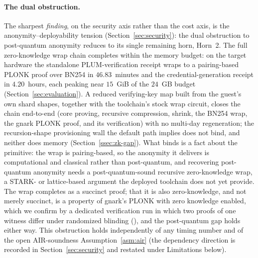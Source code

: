 \paragraph{The dual obstruction.}
The sharpest \emph{finding}, on the security axis rather than the cost axis, is the anonymity--deployability tension (Section~\ref{sec:security}): the dual obstruction to post-quantum anonymity reduces to its single remaining horn, Horn~2. The full zero-knowledge wrap chain completes within the memory budget: on the target hardware the standalone PLUM-verification receipt wraps to a pairing-based {PLONK} proof over {BN254} in $46.83$~minutes and the credential-generation receipt in $4.20$~hours, each peaking near $15$~GiB of the $24$~GB budget (Section~\ref{sec:evaluation}). A reduced verifying-key map built from the guest's own shard shapes, together with the toolchain's stock wrap circuit, closes the chain end-to-end (core proving, recursive compression, shrink, the {BN254} wrap, the gnark {PLONK} proof, and its verification) with no multi-day regeneration; the recursion-shape provisioning wall the default path implies does not bind, and neither does memory (Section~\ref{ssec:zk-gap}). What binds is a fact about the primitive: the wrap is pairing-based, so the anonymity it delivers is computational and classical rather than post-quantum, and recovering post-quantum anonymity needs a post-quantum-sound recursive zero-knowledge wrap, a {STARK}- or lattice-based argument the deployed toolchain does not yet provide. The wrap completes as a succinct proof; that it is also zero-knowledge, and not merely succinct, is a property of gnark's {PLONK} with zero knowledge enabled, which we confirm by a dedicated verification run in which two proofs of one witness differ under randomized blinding (), and the post-quantum gap holds either way. This obstruction holds independently of any timing number and of the open AIR-soundness Assumption~\ref{asm:air} (the dependency direction is recorded in Section~\ref{sec:security} and restated under Limitations below).

